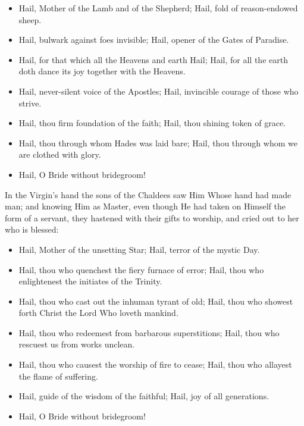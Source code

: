\documentclass[twoside, letterpaper, 12pt]{report}
\begin{document}
\begin{itemize}[label=\tiny{+},leftmargin=*]
\item Hail, Mother of the Lamb and of the Shepherd;
      Hail, fold of reason-endowed sheep.
\item Hail, bulwark against foes invisible;
      Hail, opener of the Gates of Paradise.
\item Hail, for that which all the Heavens and earth Hail;
      Hail, for all the earth doth dance its joy together with the Heavens.
\item Hail, never-silent voice of the Apostles;
      Hail, invincible courage of those who strive.
\item Hail, thou firm foundation of the faith;
      Hail, thou shining token of grace.
\item Hail, thou through whom Hades was laid bare;
      Hail, thou through whom we are clothed with
glory. 
\item Hail, O Bride without bridegroom!
\end{itemize}





\begin{reader}
  \item In the Virgin’s hand the sons of the Chaldees saw Him Whose hand had made man;
  and knowing Him as Master, even though He had taken on Himself the form of a servant,
  they hastened with their gifts to worship, and cried out to her who is blessed:
\end{reader}

\begin{itemize}[label=\tiny{+},leftmargin=*]
\item Hail, Mother of the unsetting Star;
      Hail, terror of the mystic Day.
\item Hail, thou who quenchest the fiery furnace of error;
      Hail, thou who enlightenest the initiates of the Trinity.
\item Hail, thou who cast out the inhuman tyrant of old;
      Hail, thou who showest forth Christ the Lord Who loveth mankind.
\item Hail, thou who redeemest from barbarous superstitions;
      Hail, thou who rescuest us from works unclean.
\item Hail, thou who causest the worship of fire to cease;
      Hail, thou who allayest the flame of suffering.
\item Hail, guide of the wisdom of the faithful;
      Hail, joy of all generations.
\item Hail, O Bride without bridegroom!
\end{itemize}
\end{document}

